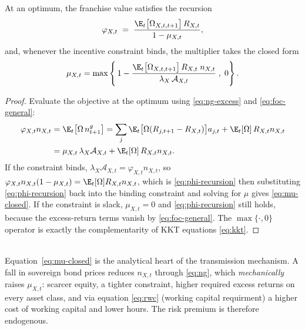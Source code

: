 \begin{proposition}
\label{prop:mu}
At an optimum, the franchise value satisfies the recursion
\begin{equation}
\varphi_{X,t}\;=\;\frac{\E_t\bigl[\Omega_{X,t,t+1}\bigr]\,R_{X,t}}{1-\mu_{X,t}},
\label{eq:phi-recursion}
\end{equation}
and, whenever the incentive constraint binds, the multiplier takes the closed form
\begin{equation}
\mu_{X,t}
=\max\left\{\,1-\frac{\E_t\bigl[\Omega_{X,t,t+1}\bigr]\,R_{X,t}\;n_{X,t}}
                     {\lambda_X\,\mathcal{A}_{X,t}}\;,\;0\right\}.
\label{eq:mu-closed}
\end{equation}
\end{proposition}
\begin{proof}
Evaluate the objective at the optimum using \eqref{eq:ng-excess} and
\eqref{eq:foc-general}:
\begin{align*}
\varphi_{X,t}n_{X,t}
&=\E_t\bigl[\Omega\,n^{g}_{t+1}\bigr]
 =\sum_j \E_t\bigl[\Omega(R_{j,t+1}-R_{X,t})\bigr]a_{j,t}
  +\E_t[\Omega]\,R_{X,t}n_{X,t}\\
&=\mu_{X,t}\,\lambda_X\mathcal{A}_{X,t}+\E_t[\Omega]\,R_{X,t}n_{X,t}.
\end{align*}
If the constraint binds, $\lambda_X\mathcal{A}_{X,t}=\varphi_{X,t}n_{X,t}$, so
$\varphi_{X,t}n_{X,t}(1-\mu_{X,t})=\E_t[\Omega]R_{X,t}n_{X,t}$, which is
\eqref{eq:phi-recursion} then substituting \eqref{eq:phi-recursion} back into the binding
constraint and solving for $\mu$ gives \eqref{eq:mu-closed}. If the constraint is
slack, $\mu_{X,t}=0$ and \eqref{eq:phi-recursion} still holds, because the excess-return
terms vanish by \eqref{eq:foc-general}. The $\max\{\cdot,0\}$ operator is exactly the complementarity of KKT equations \eqref{eq:kkt}.
\end{proof}\\
Equation~\eqref{eq:mu-closed} is the analytical heart of the transmission mechanism. A fall in sovereign bond prices reduces $n_{X,t}$ through \eqref{eq:ng}, which \emph{mechanically} raises $\mu_{X,t}$: scarcer equity, a tighter constraint, higher required excess returns on every asset class, and via equation \eqref{eq:rwc} (working capital requirment) a higher cost of working capital and lower hours. The risk premium is therefore endogenous. 

